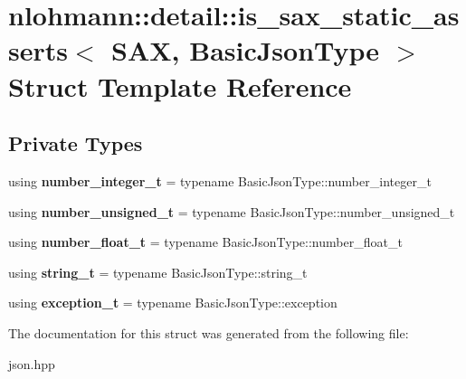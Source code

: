 \hypertarget{structnlohmann_1_1detail_1_1is__sax__static__asserts}{}\section{nlohmann\+:\+:detail\+:\+:is\+\_\+sax\+\_\+static\+\_\+asserts$<$ S\+AX, Basic\+Json\+Type $>$ Struct Template Reference}
\label{structnlohmann_1_1detail_1_1is__sax__static__asserts}
\subsection*{Private Types}
\begin{DoxyCompactItemize}
\item 
\mbox{\label{structnlohmann_1_1detail_1_1is__sax__static__asserts_a474adf99bf1eaa8292284fd3064c80fe}} 
using {\bfseries number\+\_\+integer\+\_\+t} = typename Basic\+Json\+Type\+::number\+\_\+integer\+\_\+t
\item 
\mbox{\label{structnlohmann_1_1detail_1_1is__sax__static__asserts_af8733df7fcaebb25434285885db7f127}} 
using {\bfseries number\+\_\+unsigned\+\_\+t} = typename Basic\+Json\+Type\+::number\+\_\+unsigned\+\_\+t
\item 
\mbox{\label{structnlohmann_1_1detail_1_1is__sax__static__asserts_a65d4be40c41ddc31fd2c3583d87d5faf}} 
using {\bfseries number\+\_\+float\+\_\+t} = typename Basic\+Json\+Type\+::number\+\_\+float\+\_\+t
\item 
\mbox{\label{structnlohmann_1_1detail_1_1is__sax__static__asserts_a067c98d2145bb54d862f4794ac1287bb}} 
using {\bfseries string\+\_\+t} = typename Basic\+Json\+Type\+::string\+\_\+t
\item 
\mbox{\label{structnlohmann_1_1detail_1_1is__sax__static__asserts_a34e1bc8ab7adbbab5f7d8c45a964020b}} 
using {\bfseries exception\+\_\+t} = typename Basic\+Json\+Type\+::exception
\end{DoxyCompactItemize}


The documentation for this struct was generated from the following file\+:\begin{DoxyCompactItemize}
\item 
json.\+hpp\end{DoxyCompactItemize}
